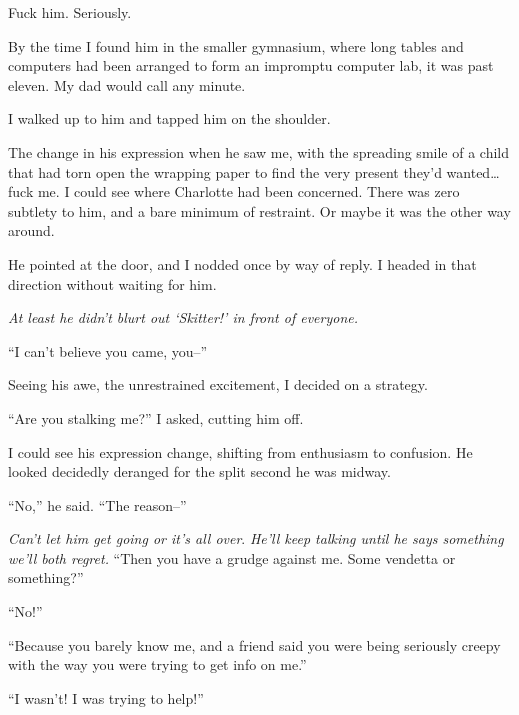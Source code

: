 Fuck him.  Seriously.



By the time I found him in the smaller gymnasium, where long tables and computers had been arranged to form an impromptu computer lab, it was past eleven.  My dad would call any minute.



I walked up to him and tapped him on the shoulder.



The change in his expression when he saw me, with the spreading smile of a child that had torn open the wrapping paper to find the very present they'd wanted\ldots fuck me.  I could see where Charlotte had been concerned.  There was zero subtlety to him, and a bare minimum of restraint.  Or maybe it was the other way around.



He pointed at the door, and I nodded once by way of reply.  I headed in that direction without waiting for him.



\emph{At least he didn't blurt out `Skitter!' in front of everyone.}



``I can't believe you came, you--''



Seeing his awe, the unrestrained excitement, I decided on a strategy.



``Are you stalking me?'' I asked, cutting him off.



I could see his expression change, shifting from enthusiasm to confusion.  He looked decidedly deranged for the split second he was midway.



``No,'' he said.  ``The reason--''



\emph{Can't let him get going or it's all over}.  \emph{He'll keep talking until he says something we'll both regret.}  ``Then you have a grudge against me.  Some vendetta or something?''



``No!''



``Because you barely know me, and a friend said you were being seriously creepy with the way you were trying to get info on me.''



``I wasn't!  I was trying to help!''



